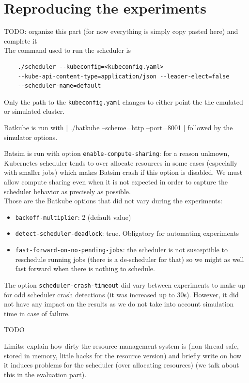 \section{Reproducing the experiments}

TODO: organize this part (for now everything is simply copy pasted here) and complete it\\

The command used to run the scheduler is
\begin{verbatim}
	./scheduler --kubeconfig=<kubeconfig.yaml>
	--kube-api-content-type=application/json --leader-elect=false
	--scheduler-name=default
\end{verbatim}
\noindent Only the path to the \texttt{kubeconfig.yaml} changes to either point the the
emulated or simulated cluster.

Batkube is run with | ./batkube --scheme=http --port=8001 |
\noindent followed by the simulator options.

Batsim is run with option \texttt{enable-compute-sharing}: for a reason
unknown, Kubernetes scheduler tends to over allocate resources in some cases
(especially with smaller jobs) which makes Batsim crash if this option is
disabled. We must allow compute sharing even when it is not expected in order
to capture the scheduler behavior as precisely as possible.\\

Those are the Batkube options that did not vary during the experiments:
\begin{itemize}
	\item \texttt{backoff-multiplier}: 2 (default value)
	\item \texttt{detect-scheduler-deadlock}: true. Obligatory for
		automating experiments
	\item \texttt{fast-forward-on-no-pending-jobs}: the scheduler is not
		susceptible to reschedule running jobs (there is a de-scheduler
		for that) so we might as well fast forward when there is
		nothing to schedule.

\end{itemize}

The option \texttt{scheduler-crash-timeout} did vary between experiments to
make up for odd scheduler crash detections (it was increased up to 30s).
However, it did not have any impact on the results as we do not take into
account simulation time in case of failure.

TODO

Limits: explain how dirty the resource management system is (non
thread safe, stored in memory, little hacks for the resource version) and
briefly write on how it induces problems for the scheduler (over allocating
resources) (we talk about this in the evaluation part).

